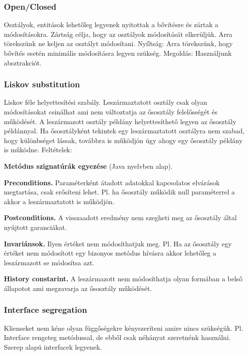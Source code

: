 \documentclass[a4paper,14pt]{extarticle}
\begin{document}
			\subsubsection{{\Large  O}pen/Closed} 
			Osztályok, entitások lehetőleg legyenek nyitottak a bővítésre és zártak a módosításokra.
			\newline
			Zártság célja, hogy az osztályok módosítását elkerüljük. Arra törekszünk ne keljen az osztályt módosítani.
			\newline
			Nyíltság: Arra törekszünk, hogy bővítés esetén minimális módosításra legyen szükség.
			\newline
			Megoldás: Használjunk absztrakciót.
				
			\subsubsection{{\Large  L}iskov substitution}
			Liskov féle helyettesítési szabály.
			Leszármaztatott osztály csak olyan módosításokat csinálhat ami nem változtatja az ősosztály felelősségét és működését. A leszármazott osztály példány helyettesíthető legyen az ősosztály példánnyal.
			Ha ősosztályként tekintek egy leszármaztatott osztályra nem szabad, hogy különbséget lássak, továbbra is működjön úgy ahogy egy ősosztály példány is működne.
			Feltételek:
			\begin{compactitem}
				\item \textbf{ Metódus szignatúrák egyezése} (Java nyelvben alap).
				\item \textbf{ Preconditions.} Paraméterként átadott adatokkal kapcsolatos elvárások megtartása, csak erősíteni lehet. Pl. ha ősosztály működik null paraméterrel a akkor a leszármaztatott is működjön.
				\item \textbf{Postconditions.} A visszaadott eredmény nem szegheti meg az ősosztály által nyújtott garanciákat.
				\item \textbf{Invariánsok.} Ilyen értéket nem módosíthatjuk meg. Pl. Ha az ősosztály egy értéket nem módosított egy bizonyos metódus hívásra akkor lehetőleg a leszármazott se módosítsa azt.
				\item \textbf{History constarint.} A leszármazott nem módosíthatja olyan formában a belső állapotot ami megzavarja az ősosztály működését.
			\end{compactitem}
		
			\subsubsection{{\Large  I}nterface segregation}
			Klienseket nem kéne olyan függőségekre kényszeríteni amire nincs szükségük.
			Pl. Interface rengeteg metódussal, de ebből csak néhányat szeretnénk használni. Szerep alapú interfacek legyenek.
\end{document}
